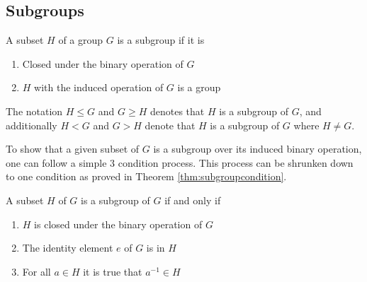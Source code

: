 \documentclass[../notes.tex]{subfiles}
\begin{document}
\subsection{Subgroups}

\begin{definition}[Subgroup]
	A subset $H$ of a group $G$ is a subgroup if it is
	\begin{enumerate}
		\item Closed under the binary operation of $G$
		\item $H$ with the induced operation of $G$ is a group
	\end{enumerate}
	The notation $H \leq G$ and $G \geq H$ denotes that $H$ is a subgroup of $G$, and additionally $H < G$ and $G > H$ denote that $H$ is a subgroup of $G$ where $H \neq G$.
\end{definition}

To show that a given subset of $G$ is a subgroup over its induced binary operation, one can follow a simple $3$ condition process. This process can be shrunken down to one condition as proved in Theorem \ref{thm:subgroupcondition}.

\begin{theorem}[Subgroup]
	\label{thm:subgroup}
	A subset $H$ of $G$ is a subgroup of $G$ if and only if
	\begin{enumerate}
		\item $H$ is closed under the binary operation of $G$
		\item The identity element $e$ of $G$ is in $H$ 
		\item For all $a \in H$ it is true that $a^{-1} \in H$
	\end{enumerate}
\end{theorem}
\end{document}

